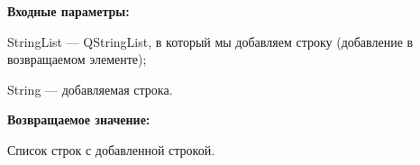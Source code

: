 \textbf{Входные параметры:}
 
StringList --- QStringList, в который мы добавляем строку (добавление в возвращаемом элементе);

     String --- добавляемая строка.

\textbf{Возвращаемое значение:}

Список строк с добавленной строкой.